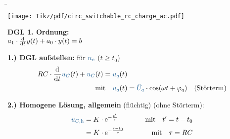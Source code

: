 \b{%
\begin{frame}[t]%
    \begin{minipage}{\textwidth}\centering%
        \begin{minipage}[t][][t]{0.48\textwidth}\centering\vspace{0cm}%
            \texttt{[image: Tikz/pdf/circ\_switchable\_rc\_charge\_ac.pdf]}
        \end{minipage}%
        \begin{minipage}[t][][t]{0.48\textwidth}\centering\vspace{0cm}%
            \vspace{0.8cm}
            \textbf{DGL 1. Ordnung:}\\[0.85em]
            $a_1 \cdot \frac{\mathrm{d}^{{}}}{\mathrm{d}t^{{}}} y(t) + a_0 \cdot y(t)=b$\\
        \end{minipage}%
    \end{minipage}%
    \vspace{0.85cm}
    \textbf{1.) DGL aufstellen:} für $\ecv{u_c}$ ($t \geq t_0$)\\[-1em]
    \begin{align*}
        RC \cdot \dt \ecv{u_C}(t) + \ecv{u_C}(t) ={}& \ecv{u_q}(t) \\
        \text{mit} \quad &\ecv{u_q}(t) = \ecv{\hat{U}_q} \cdot \cos(\omega t + \varphi_q)\quad\text{(Störterm)}
    \end{align*}\pause

    \textbf{2.) Homogene Lösung, allgemein} (flüchtig) (ohne Störterm):
    \begin{align*}
        \ecv{u_{C,\mathrm{h}}} &= K \cdot \mathrm{e}^{-\frac{t'}{\tau}} \qquad &\text{mit} \quad t' = t-t_0 \\
        &= K \cdot \mathrm{e}^{-\frac{t-t_0}{\tau}} \qquad &\text{mit} \quad \tau = RC
    \end{align*}%


\end{frame}}
